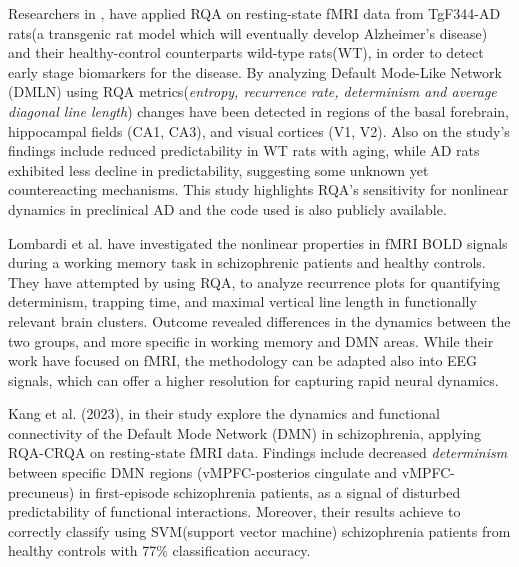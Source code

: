 \documentclass{article}
\begin{document}

			Researchers in \cite{rezaei},
			have applied RQA on resting-state fMRI data from 
			TgF344-AD rats(a transgenic rat model which will eventually develop Alzheimer’s disease)
			and their healthy-control counterparts wild-type rats(WT),
			in order to detect early stage biomarkers for the disease.
			By analyzing Default Mode-Like Network (DMLN) 
			using RQA metrics(\textit{entropy, recurrence rate, determinism 
			and average diagonal line length}) 
			changes have been detected in regions of 
			the basal forebrain, hippocampal fields (CA1, CA3), and visual 
			cortices (V1, V2). Also on the study's findings include reduced predictability in 
			WT rats with aging, while AD rats exhibited less decline
			in predictability, suggesting some unknown yet countereacting mechanisms. 
			This study highlights RQA's sensitivity for nonlinear dynamics 
			in preclinical AD and the code used is also publicly available.


			Lombardi et al.\cite{Lombardi2014} have investigated the 
			nonlinear properties in fMRI BOLD signals 
			during a working memory task in 
			schizophrenic patients and healthy controls. 
			They have attempted by using RQA, to analyze recurrence plots 
			for quantifying determinism, trapping time, 
			and maximal vertical line length 
			in functionally relevant brain clusters. 
			Outcome revealed differences in 
			the dynamics between the two groups, 
			and more specific in working memory and DMN areas. 
			While their work have focused on fMRI, the methodology can be adapted also into
			EEG signals, which can offer a higher resolution for capturing rapid neural dynamics.

			Kang et al. (2023)\cite{kang}, in their study explore the dynamics and functional connectivity of the 
			Default Mode Network (DMN) in schizophrenia, applying RQA-CRQA on resting-state fMRI data. 
			Findings include decreased \textit{determinism} between specific DMN regions 
			(vMPFC-posterios cingulate and vMPFC-precuneus) in first-episode schizophrenia patients, 
			as a signal of disturbed predictability of functional interactions. 
			Moreover, their results achieve to correctly classify using SVM(support vector machine)
			schizophrenia patients from healthy controls with 77\% classification accuracy.
\end{document}
